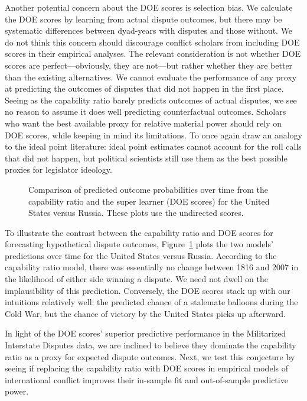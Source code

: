 Another potential concern about the DOE scores is selection bias.
We calculate the DOE scores by learning from actual dispute outcomes, but there may be systematic differences between dyad-years with disputes and those without.
We do not think this concern should discourage conflict scholars from including DOE scores in their empirical analyses.
The relevant consideration is not whether DOE scores are perfect---obviously, they are not---but rather whether they are better than the existing alternatives.
We cannot evaluate the performance of any proxy at predicting the outcomes of disputes that did not happen in the first place.
Seeing as the capability ratio barely predicts outcomes of actual disputes, we see no reason to assume it does well predicting counterfactual outcomes.
Scholars who want the best available proxy for relative material power should rely on DOE scores, while keeping in mind its limitations.
To once again draw an analogy to the ideal point literature: ideal point estimates cannot account for the roll calls that did not happen, but political scientists still use them as the best possible proxies for legislator ideology.

\begin{figure}[tp]
  \centering
  
  \vspace{-2em}
  \caption{
    Comparison of predicted outcome probabilities over time from the capability ratio and the super learner (DOE scores) for the United States versus Russia.
    These plots use the undirected scores.
  }
  \label{fig:vs}
\end{figure}

To illustrate the contrast between the capability ratio and DOE scores for forecasting hypothetical dispute outcomes, Figure~\ref{fig:vs} plots the two models' predictions over time for the United States versus Russia.
According to the capability ratio model, there was essentially no change between 1816 and 2007 in the likelihood of either side winning a dispute.
We need not dwell on the implausibility of this prediction.
Conversely, the DOE scores stack up with our intuitions relatively well: the predicted chance of a stalemate balloons during the Cold War, but the chance of victory by the United States picks up afterward.

In light of the DOE scores' superior predictive performance in the Militarized Interstate Disputes data, we are inclined to believe they dominate the capability ratio as a proxy for expected dispute outcomes.
Next, we test this conjecture by seeing if replacing the capability ratio with DOE scores in empirical models of international conflict improves their in-sample fit and out-of-sample predictive power.

